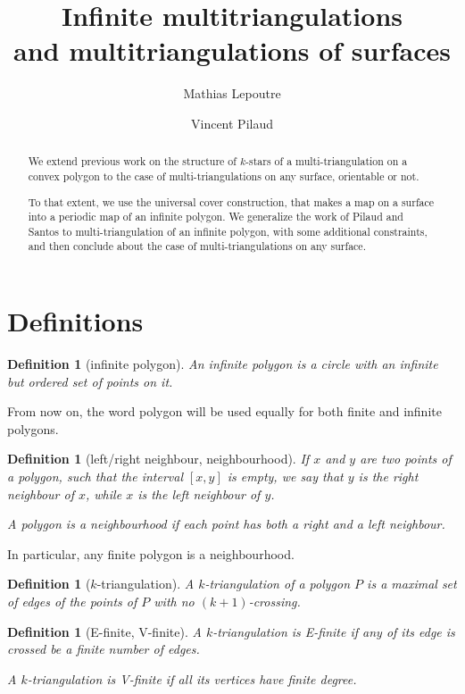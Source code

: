 \documentclass{amsart}
\title[Infinite multitriangulations and multitriangulations of surfaces]{Infinite multitriangulations \\ and multitriangulations of surfaces}
\author{Mathias Lepoutre}
\author{Vincent Pilaud}
\newtheorem{definition}[theorem]{Definition}
\theoremstyle{remark}
\newcommand{\darkblue}{\color{darkblue}} %
\newcommand{\defn}[1]{\textsl{\darkblue #1}} %
\newcommand*{\nbd}[0]{neighbourhood\xspace}
\newcommand*{\ef}[0]{E-finite\xspace}
\newcommand*{\vf}[0]{V-finite\xspace}
\begin{document}
\begin{abstract}
We extend previous work on the structure of $k$-stars of a multi-triangulation on a convex polygon to the case of multi-triangulations on any surface, orientable or not. 

To that extent, we use the universal cover construction, that makes a map on a surface into a periodic map of an infinite polygon. We generalize the work of Pilaud and Santos to multi-triangulation of an infinite polygon, with some additional constraints, and then conclude about the case of multi-triangulations on any surface.
\end{abstract}

\maketitle

\section{Definitions}


\begin{definition}[infinite polygon]
An \defn{infinite polygon} is a circle with an infinite but ordered set of points on it.
\end{definition}

From now on, the word polygon will be used equally for both finite and infinite polygons.

\begin{definition}[left/right neighbour, \nbd]
If $x$ and $y$ are two points of a polygon, such that the interval $[x,y]$ is empty, we say that $y$ is the \defn{right neighbour} of $x$, while $x$ is the \defn{left neighbour} of $y$.

A polygon is a \nbd if each point has both a right and a left neighbour.
\end{definition}

In particular, any finite polygon is a \nbd.

\begin{definition}[$k$-triangulation]
A $k$-triangulation of a polygon $P$ is a maximal set of edges of the points of $P$ with no $(k+1)$-crossing.
\end{definition}

\begin{definition}[\ef, \vf]
A $k$-triangulation is \ef if any of its edge is crossed be a finite number of edges.

A $k$-triangulation is \vf if all its vertices have finite degree.
\end{definition}
\end{document}
